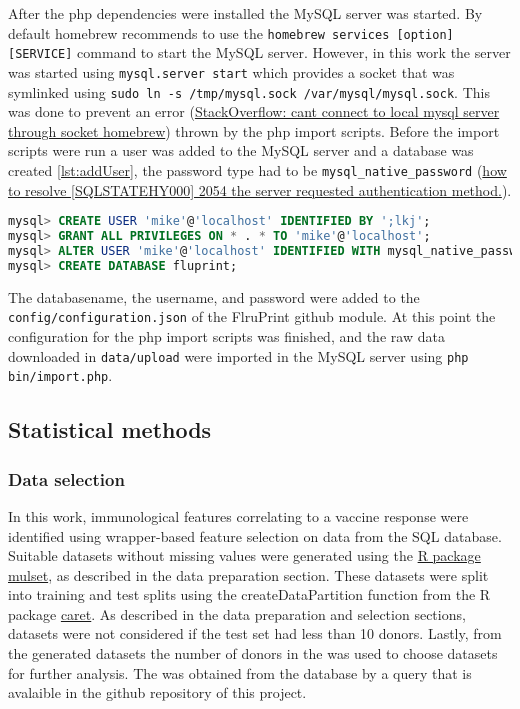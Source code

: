After the php dependencies were installed the MySQL server was started. By
default homebrew recommends to use the \lstinline{homebrew services [option] [SERVICE]} command to start the MySQL server. However, in this work the server
was started using \lstinline{mysql.server start} which provides a socket that
was symlinked using \lstinline{sudo ln -s /tmp/mysql.sock /var/mysql/mysql.sock}. This was done to prevent an error
(\href{https://stackoverflow.com/questions/15016376/cant-connect-to-local-mysql-server-through-socket-homebrew/18090173}{StackOverflow: cant connect to local mysql server through socket homebrew}) thrown
by the php import scripts. Before the import scripts were run a user was added to the
MySQL server and a database was created \ref{lst:addUser}, the password type had to be \lstinline{mysql_native_password}
(\href{https://stackoverflow.com/questions/62873680/how-to-resolve-sqlstatehy000-2054-the-server-requested-authentication-metho}{how to resolve [SQLSTATEHY000] 2054 the server requested authentication method.}).

\begin{lstlisting}[language=sql, caption=Adding user and database to sql server, label={lst:addUser}]
mysql> CREATE USER 'mike'@'localhost' IDENTIFIED BY ';lkj';
mysql> GRANT ALL PRIVILEGES ON * . * TO 'mike'@'localhost';
mysql> ALTER USER 'mike'@'localhost' IDENTIFIED WITH mysql_native_password BY 'mike';
mysql> CREATE DATABASE fluprint;
\end{lstlisting}

The databasename, the username, and password were added to the
\lstinline{config/configuration.json} of the FlruPrint github module. At this
point the configuration for the php import scripts was finished, and the raw
data downloaded in \lstinline{data/upload} were imported in the MySQL server
using \lstinline{php bin/import.php}.

\subsection{Statistical methods}

\subsubsection{Data selection}

In this work, immunological features correlating to a vaccine response were identified using wrapper-based feature selection on data from the \flup SQL database.
Suitable datasets without missing values were generated using the \href{https://cran.r-project.org/web/packages/mulset/index.html}{R package mulset}, as described in the data preparation section.
These datasets were split into training and test splits using the createDataPartition function from the R package \href{https://topepo.github.io/caret/}{caret}.
As described in the data preparation and selection sections, datasets were not considered if the test set had less than 10 donors.
Lastly, from the generated datasets the number of donors in the \secondvis was used to choose datasets for further analysis. The \secondvis was obtained from the database by a query that is avalaible in the github repository of this project.

